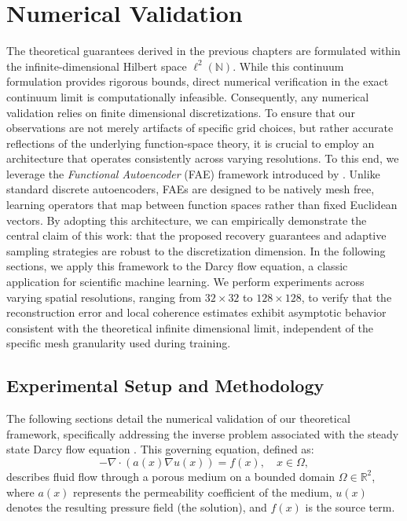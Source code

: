 \documentclass[a4paper,oneside]{amsart}
\newcommand{\N}{\mathbb{N}}
\newcommand{\R}{\mathbb{R}}
\begin{document}
\section{Numerical Validation}\label{sec:numerics}
The theoretical guarantees derived in the previous chapters are formulated within the infinite-dimensio\-nal Hilbert space $\ell^2(\N)$. While this continuum formulation provides rigorous bounds, direct numerical verification in the exact continuum limit is computationally infeasible. Consequently, any numerical validation relies on finite dimensional discretizations. To ensure that our observations are not merely artifacts of specific grid choices, but rather accurate reflections of the underlying function-space theory, it is crucial to employ an architecture that operates consistently across varying resolutions.
To this end, we leverage the \textit{Functional Autoencoder} (FAE) framework introduced by \cite{bunker2025autoencoders}. Unlike standard discrete autoencoders, FAEs are designed to be natively mesh free, learning operators that map between function spaces rather than fixed Euclidean vectors. By adopting this architecture, we can empirically demonstrate the central claim of this work: that the proposed recovery guarantees and adaptive sampling strategies are robust to the discretization dimension.
In the following sections, we apply this framework to the Darcy flow equation, a classic application for scientific machine learning. We perform experiments across varying spatial resolutions, ranging from $32 \times 32$ to $128 \times 128$, to verify that the reconstruction error and local coherence estimates exhibit asymptotic behavior consistent with the theoretical infinite dimensional limit, independent of the specific mesh granularity used during training.
\subsection{Experimental Setup and Methodology}
The following sections detail the numerical validation of our theoretical framework, specifically addressing the inverse problem associated with the steady state Darcy flow equation \cite{darcy1} \cite{darcy2}. This governing equation, defined as:
\begin{equation}
    -\nabla \cdot (a(x) \nabla u(x)) = f(x), \quad x \in \Omega,
\end{equation}
describes fluid flow through a porous medium on a bounded domain $\Omega \in \R^2$, where $a(x)$ represents the permeability coefficient of the medium, $u(x)$ denotes the resulting pressure field (the solution), and $f(x)$ is the source term.\smallskip %
\end{document}
